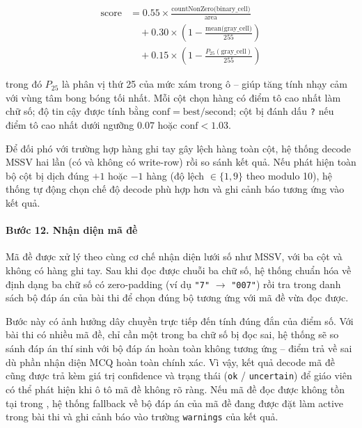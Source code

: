 \begin{equation}
\begin{split}
\text{score} &= 0.55 \times \frac{\text{countNonZero(binary\_cell)}}{\text{area}} \\[3pt]
&\quad + 0.30 \times \left(1 - \frac{\text{mean(gray\_cell)}}{255}\right) \\[3pt]
&\quad + 0.15 \times \left(1 - \frac{P_{25}(\text{gray\_cell})}{255}\right)
\end{split}
\label{eq:cell_score}
\end{equation}

trong đó $P_{25}$ là phân vị thứ 25 của mức xám trong ô -- giúp tăng tính nhạy cảm với vùng tâm bong bóng tối nhất. Mỗi cột chọn hàng có điểm tô cao nhất làm chữ số; độ tin cậy được tính bằng $\text{conf} = \text{best} / \text{second}$; cột bị đánh dấu \texttt{?} nếu điểm tô cao nhất dưới ngưỡng $0.07$ hoặc $\text{conf} < 1.03$.

Để đối phó với trường hợp hàng ghi tay gây lệch hàng toàn cột, hệ thống decode MSSV hai lần (có và không có write-row) rồi so sánh kết quả. Nếu phát hiện toàn bộ cột bị dịch đúng $+1$ hoặc $-1$ hàng (độ lệch $\in \{1, 9\}$ theo modulo 10), hệ thống tự động chọn chế độ decode phù hợp hơn và ghi cảnh báo tương ứng vào kết quả.

\paragraph{Bước 12. Nhận diện mã đề}

Mã đề được xử lý theo cùng cơ chế nhận diện lưới số như MSSV, với ba cột và không có hàng ghi tay. Sau khi đọc được chuỗi ba chữ số, hệ thống chuẩn hóa về định dạng ba chữ số có zero-padding (ví dụ \texttt{"7"} $\to$ \texttt{"007"}) rồi tra trong danh sách bộ đáp án của bài thi để chọn đúng bộ tương ứng với mã đề vừa đọc được.

Bước này có ảnh hưởng dây chuyền trực tiếp đến tính đúng đắn của điểm số. Với bài thi có nhiều mã đề, chỉ cần một trong ba chữ số bị đọc sai, hệ thống sẽ so sánh đáp án thí sinh với bộ đáp án hoàn toàn không tương ứng -- điểm trả về sai dù phần nhận diện MCQ hoàn toàn chính xác. Vì vậy, kết quả decode mã đề cũng được trả kèm giá trị confidence và trạng thái (\texttt{ok} / \texttt{uncertain}) để giáo viên có thể phát hiện khi ô tô mã đề không rõ ràng. Nếu mã đề đọc được không tồn tại trong , hệ thống fallback về bộ đáp án của mã đề đang được đặt làm active trong bài thi và ghi cảnh báo vào trường \texttt{warnings} của kết quả.

